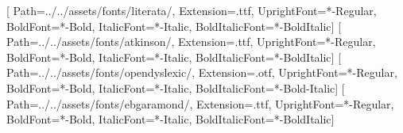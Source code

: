 
\usepackage{fontspec}
\setmainfont{Literata}[
  Path=../../assets/fonts/literata/, Extension=.ttf,
  UprightFont=*-Regular, BoldFont=*-Bold, ItalicFont=*-Italic, BoldItalicFont=*-BoldItalic]
\setsansfont{AtkinsonHyperlegible}[
  Path=../../assets/fonts/atkinson/, Extension=.ttf,
  UprightFont=*-Regular, BoldFont=*-Bold, ItalicFont=*-Italic, BoldItalicFont=*-BoldItalic]
\newfontfamily{}[
  Path=../../assets/fonts/opendyslexic/, Extension=.otf,
  UprightFont=*-Regular, BoldFont=*-Bold, ItalicFont=*-Italic, BoldItalicFont=*-Bold-Italic]
\newfontfamily{}[
  Path=../../assets/fonts/ebgaramond/, Extension=.ttf,
  UprightFont=*-Regular, BoldFont=*-Bold, ItalicFont=*-Italic, BoldItalicFont=*-BoldItalic]

\usepackage[a4paper, margin=2.4cm, headheight=14pt]{geometry}
\usepackage{graphicx}
\usepackage[table]{xcolor}
\usepackage{booktabs, tabularx, array}
\usepackage{enumitem}
\usepackage{fancyhdr}
\usepackage{titlesec}
\usepackage[most]{tcolorbox}
\usepackage[hidelinks]{hyperref}


\setlength{\parskip}{0.55em}
\setlength{\parindent}{0pt}
\linespread{1.08}

\titleformat{\section}{\sffamily\Large\bfseries\color{violet}}{\thesection}{0.8em}{}
\titleformat{\subsection}{\sffamily\large\bfseries\color{violet}}{\thesubsection}{0.7em}{}
\titlespacing*{\section}{0pt}{1.6em}{0.6em}
\titlespacing*{\subsection}{0pt}{1.1em}{0.35em}
\usepackage{needspace, etoolbox}


